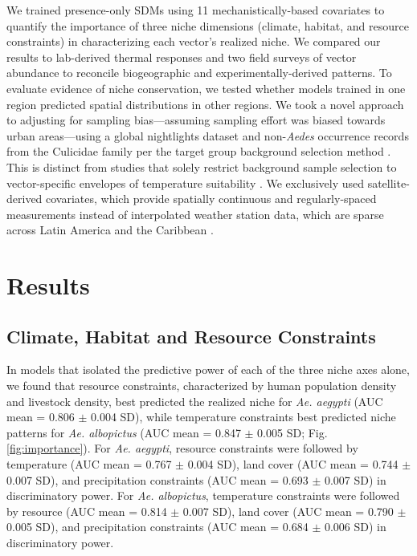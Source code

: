 \noindent We trained presence-only SDMs using 11 mechanistically-based covariates to quantify the importance of three niche dimensions (climate, habitat, and resource constraints) in characterizing each vector’s realized niche. We compared our results to lab-derived thermal responses and two field surveys of vector abundance to reconcile biogeographic and experimentally-derived patterns. To evaluate evidence of niche conservation, we tested whether models trained in one region predicted spatial distributions in other regions. We took a novel approach to adjusting for sampling bias—assuming sampling effort was biased towards urban areas—using a global nightlights dataset and non-\textit{Aedes} occurrence records from the Culicidae family per the target group background selection method \cite{Phillips2009-nf, Merow2013-mw}. This is distinct from studies that solely restrict background sample selection to vector-specific envelopes of temperature suitability \cite{Brady2014-ti, Kraemer2015-ct}. We exclusively used satellite-derived covariates, which provide spatially continuous and regularly-spaced measurements instead of interpolated weather station data, which are sparse across Latin America and the Caribbean \cite{Fick2017-am}.

\section{Results}

\subsection{Climate, Habitat and Resource Constraints}

In models that isolated the predictive power of each of the three niche axes alone, we found that resource constraints, characterized by human population density and livestock density, best predicted the realized niche for \textit{Ae. aegypti} (AUC mean = 0.806 $\pm$ 0.004 SD), while temperature constraints best predicted niche patterns for \textit{Ae. albopictus} (AUC mean = 0.847 $\pm$ 0.005 SD; Fig. \ref{fig:importance}). For \textit{Ae. aegypti}, resource constraints were followed by temperature (AUC mean = 0.767 $\pm$ 0.004 SD), land cover (AUC mean = 0.744 $\pm$ 0.007 SD), and precipitation constraints (AUC mean = 0.693 $\pm$ 0.007 SD) in discriminatory power. For \textit{Ae. albopictus}, temperature constraints were followed by resource (AUC mean = 0.814 $\pm$ 0.007 SD), land cover (AUC mean = 0.790 $\pm$ 0.005 SD), and precipitation constraints (AUC mean = 0.684 $\pm$ 0.006 SD) in discriminatory power.

